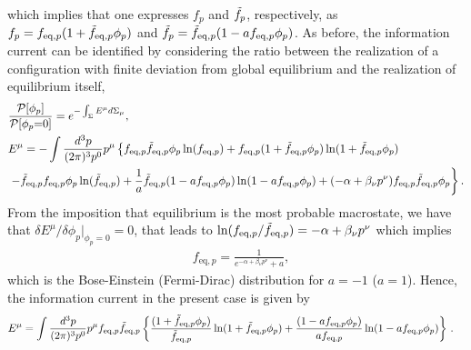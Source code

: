 \documentclass[aps,prd,preprint,nofootinbib,amsmath,amssymb,showpacs,longbibliography,singlecolumn,superscriptaddress,10pt]{revtex4-1}
\theoremstyle{plain}
\theoremstyle{definition}
\begin{document}
%
which implies that one expresses $f_{p}$ and $\Tilde{f}_{p}$, respectively, as $f_{p} = f_{\mathrm{eq},p}(1 + \Tilde{f}_{\mathrm{eq},p} \phi_{p})$ and
$\Tilde{f}_{p} = \Tilde{f}_{\mathrm{eq},p}(1 - a f_{\mathrm{eq},p} \phi_{p}) $. As before, the information current can be identified by considering the ratio between the realization of a configuration with finite deviation from global equilibrium and the realization of equilibrium itself, 
%
\begin{equation}
\begin{aligned}
& \dfrac{\mathcal{P}[\phi_p]}{\mathcal{P}[\phi_p{=}0]} = e^{-\int_\Sigma E^\mu d\Sigma_\mu},
\\
&
E^\mu = - \int \dfrac{d^3 p}{(2\pi)^3 p^0} p^\mu   \left\{  
f_{\text{eq},p}\Tilde{f}_{\text{eq},p} \phi_{p}
\ln(f_{\text{eq},p}) 
+
f_{\text{eq},p}(1 + \Tilde{f}_{\text{eq},p} \phi_{p})
\ln(1 + \Tilde{f}_{\text{eq},p} \phi_{p}) 
\right.
\\
&
\left.
-
\Tilde{f}_{\text{eq},p} f_{\text{eq},p} \phi_{p}
\ln(\Tilde{f}_{\text{eq},p}) 
+
\frac{1}{a}\Tilde{f}_{\text{eq},p}(1 - a f_{\text{eq},p} \phi_{p})
\ln(1 - a f_{\text{eq},p} \phi_{p})
+
(-
\alpha
+
\beta_{\nu} p^{\nu}) f_{\text{eq},p} \Tilde{f}_{\text{eq},p} \phi_{p}
\right\}.
\end{aligned}    
\end{equation}
%
From the imposition that equilibrium is the most probable macrostate, we have that $\delta E^{\mu}/\delta \phi_{p} \vert_{\phi_{p} = 0} = 0$, that leads to $
\ln(f_{\text{eq},p}/\Tilde{f}_{\text{eq},p}) = 
-\alpha
+
\beta_{\nu} p^{\nu}
$ which implies
%
\begin{equation}
\begin{aligned}
&
f_{\text{eq},p} = \frac{1}{e^{-\alpha
+
\beta_{\nu} p^{\nu}} + a},
\end{aligned}
\end{equation}
%
which is the Bose-Einstein (Fermi-Dirac) distribution for $a = -1$ ($a = 1$). Hence, the information current in the present case is given by
%
\begin{equation}
\label{eq:phuiummum-BE-FD}
\begin{aligned}
&
E^\mu = \int \dfrac{d^3 p}{(2\pi)^3 p^0} p^\mu f_{\text{eq},p} \Tilde{f}_{\text{eq},p}\left\{  
\frac{(1 + \Tilde{f}_{\text{eq},p} \phi_{p})}{\Tilde{f}_{\text{eq},p}}
\ln(1 + \Tilde{f}_{\text{eq},p} \phi_{p}) 
+
\frac{(1 - a f_{\text{eq},p} \phi_{p})}{a f_{\text{eq},p}}
\ln(1 - a f_{\text{eq},p} \phi_{p})
\right\}
 \, .
\end{aligned}
\end{equation}
\end{document}
